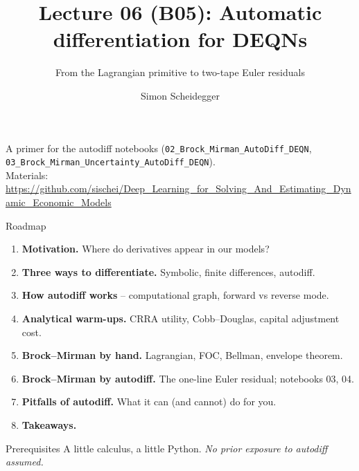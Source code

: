 \documentclass[aspectratio=169,11pt]{beamer}
\title[Lecture 06 (B05)]{Lecture 06 (B05): Automatic differentiation for DEQNs}
\subtitle{From the Lagrangian primitive to two-tape Euler residuals}
\author{Simon Scheidegger}
\institute[HEC Lausanne]{HEC, University of Lausanne}
\date{}
\begin{document}

{
\begin{frame}
\titlepage
\vspace{-0.4cm}
\begin{center}
{\footnotesize A primer for the autodiff notebooks (\texttt{02\_Brock\_Mirman\_AutoDiff\_DEQN}, \texttt{03\_Brock\_Mirman\_Uncertainty\_AutoDiff\_DEQN}).}\\[4pt]
{\footnotesize Materials: \url{https://github.com/sischei/Deep_Learning_for_Solving_And_Estimating_Dynamic_Economic_Models}}
\end{center}
\end{frame}
}

\begin{frame}{Roadmap}
\begin{enumerate}\itemsep4pt
  \item \textbf{Motivation.} Where do derivatives appear in our models?
  \item \textbf{Three ways to differentiate.} Symbolic, finite differences, autodiff.
  \item \textbf{How autodiff works} -- computational graph, forward vs reverse mode.
  \item \textbf{Analytical warm-ups.} CRRA utility, Cobb--Douglas, capital adjustment cost.
  \item \textbf{Brock--Mirman by hand.} Lagrangian, FOC, Bellman, envelope theorem.
  \item \textbf{Brock--Mirman by autodiff.} The one-line Euler residual; notebooks 03, 04.
  \item \textbf{Pitfalls of autodiff.} What it can (and cannot) do for you.
  \item \textbf{Takeaways.}
\end{enumerate}
\vspace{6pt}
\begin{block}{Prerequisites}
\small
A little calculus, a little Python. \emph{No prior exposure to autodiff assumed.}
\end{block}
\end{frame}
\end{document}
